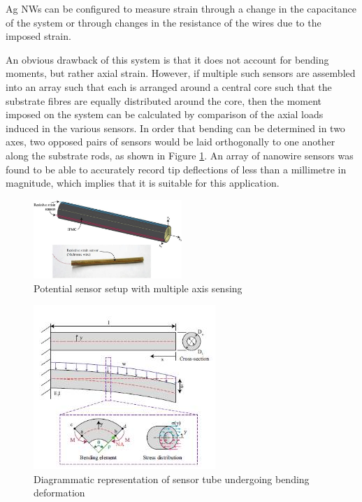 \documentclass[conference, a4paper]{IEEEtran}
\begin{document}
Ag NWs can be configured to measure strain through a change in the capacitance of the system\cite{Ho2015} or through
changes in the resistance of the wires due to the imposed strain.



An obvious drawback of this system is that it does not account for bending moments, but rather axial strain.
However, if multiple such sensors are assembled into an array such that each is arranged around a central core
such that the substrate fibres are equally distributed around the core, then the moment imposed on the system
can be calculated by comparison of the axial loads induced in the various sensors. In order that bending can be
determined in two axes, two opposed pairs of sensors would be laid orthogonally to one another along the
substrate rods, as shown in Figure \ref{fig:potential}. An array of nanowire sensors was
found to be able to accurately record tip deflections of less than a millimetre in magnitude, which implies that it
is suitable for this application.\cite{Ho2015}

\begin{figure}[h!]
	\centering
	\includegraphics[width=0.5\textwidth]{assets/sensorSetup.jpg}
	\caption{Potential sensor setup with multiple axis sensing\cite{Tsugawa2015}}
	\label{fig:potential}
\end{figure}

\begin{figure}[h!]
	\centering
	\includegraphics{assets/bendingDeformation.jpg}
	\caption{Diagrammatic representation of sensor tube undergoing bending deformation\cite{Tsugawa2015}}
	\label{fig:deviation}
\end{figure}
\end{document}
